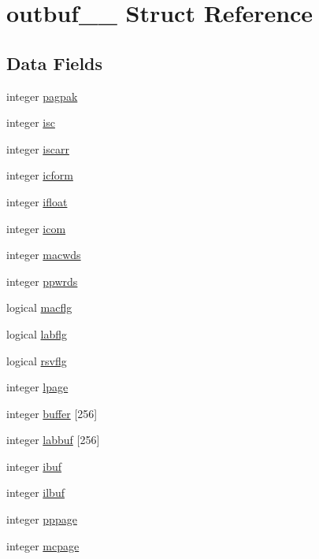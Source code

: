 \hypertarget{structoutbuf__1__}{}\section{outbuf\+\_\+\_\+ Struct Reference}
\label{structoutbuf__1__}
\subsection*{Data Fields}
\begin{DoxyCompactItemize}
\item 
integer \hyperlink{structoutbuf__1___a0a2950238f2d0e44d082ada3df7243c8}{pagpak}
\item 
integer \hyperlink{structoutbuf__1___ae282bba1de4bec18652d5f15db9d42ee}{isc}
\item 
integer \hyperlink{structoutbuf__1___ad498812091931fecc1b4139c6209950a}{iscarr}
\item 
integer \hyperlink{structoutbuf__1___a6b47c53d77563c0f5b5c45157c3ee387}{icform}
\item 
integer \hyperlink{structoutbuf__1___a7ab888b47ccedaee0f7929f9ca031dce}{ifloat}
\item 
integer \hyperlink{structoutbuf__1___a17f3b29c4b003845003f61d478526430}{icom}
\item 
integer \hyperlink{structoutbuf__1___a29392e1ee5de156807889372620bf343}{macwds}
\item 
integer \hyperlink{structoutbuf__1___ab7b0bc9f0f51da45931598759d2c5038}{ppwrds}
\item 
logical \hyperlink{structoutbuf__1___afc42ddacca1bc9897310c19bd26f7598}{macflg}
\item 
logical \hyperlink{structoutbuf__1___a9eb581af4d83597c1c878efd84d46849}{labflg}
\item 
logical \hyperlink{structoutbuf__1___a2274669ab85a2ca71435cfa276df333b}{rsvflg}
\item 
integer \hyperlink{structoutbuf__1___a04d320f6c200a362b93f57cf310cfa20}{lpage}
\item 
integer \hyperlink{structoutbuf__1___a8eec95aab202f7fc976c344442d7a03d}{buffer} \mbox{[}256\mbox{]}
\item 
integer \hyperlink{structoutbuf__1___a9213c06cf8b8ce3080bf96efd6fcebdd}{labbuf} \mbox{[}256\mbox{]}
\item 
integer \hyperlink{structoutbuf__1___acda118a94cb8b877283965c2ebb78897}{ibuf}
\item 
integer \hyperlink{structoutbuf__1___a5decb0070d3105fbffb4c2671b5df124}{ilbuf}
\item 
integer \hyperlink{structoutbuf__1___a27eb4a4bc2ef810478115969649a48e9}{pppage}
\item 
integer \hyperlink{structoutbuf__1___a8ac9d2549f54bce2332dcbb015884f83}{mcpage}
\end{DoxyCompactItemize}


